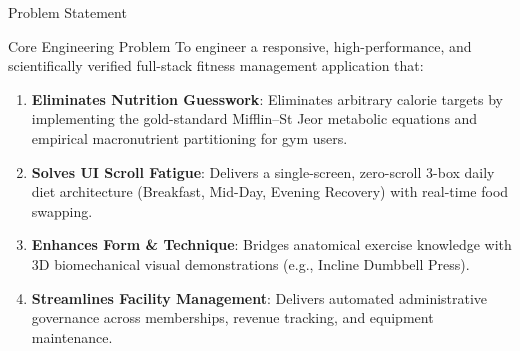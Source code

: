 \documentclass[aspectratio=169,10pt]{beamer}
\begin{document}
\begin{frame}{Problem Statement}
  \begin{block}{Core Engineering Problem}
    To engineer a responsive, high-performance, and scientifically verified full-stack fitness management application that:
  \end{block}
  \begin{enumerate}
    \item \textbf{Eliminates Nutrition Guesswork}: Eliminates arbitrary calorie targets by implementing the gold-standard Mifflin--St Jeor metabolic equations and empirical macronutrient partitioning for gym users.
    \item \textbf{Solves UI Scroll Fatigue}: Delivers a single-screen, zero-scroll 3-box daily diet architecture (Breakfast, Mid-Day, Evening Recovery) with real-time food swapping.
    \item \textbf{Enhances Form \& Technique}: Bridges anatomical exercise knowledge with 3D biomechanical visual demonstrations (e.g., Incline Dumbbell Press).
    \item \textbf{Streamlines Facility Management}: Delivers automated administrative governance across memberships, revenue tracking, and equipment maintenance.
  \end{enumerate}
\end{frame}
\end{document}
